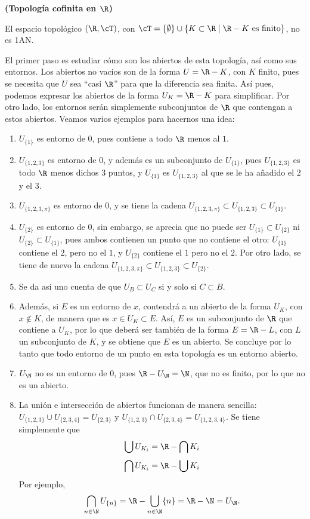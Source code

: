\begin{ej}
    {\bf (Topología cofinita en $\R$)} 
    \item El espacio topológico $(\R, \cT)$, con $\cT = \{\emptyset\} \cup \{K \subset \R \mid \R - K \text{ es finito}\}$, no es 1AN.\smallskip
    
    El primer paso es estudiar cómo son los abiertos de esta topología, así como sus entornos. Los abiertos no vacíos son de la forma $U = \R - K$, con $K$ finito, pues se necesita que $U$ sea ``casi $\R$'' para que la diferencia sea finita.  Así pues, podemos expresar los abiertos de la forma $U_K = \R - K$ para simplificar. Por otro lado, los entornos serán simplemente subconjuntos de $\R$ que contengan a estos abiertos. Veamos varios ejemplos para hacernos una idea:
    \begin{enumerate}[label=--, topsep=0pt, itemsep=0pt]
        \item $U_{\{1\}}$ es entorno de $0$, pues contiene a todo $\R$ menos al $1$.
        \item $U_{\{1,2,3\}}$ es entorno de $0$, y además es un subconjunto de $U_{\{1\}}$, pues $U_{\{1,2,3\}}$ es todo $\R$ menos dichos $3$ puntos, y $U_{\{1\}}$ es $U_{\{1,2,3\}}$ al que se le ha añadido el $2$ y el $3$.
        \item $U_{\{1,2,3, \pi\}}$ es entorno de $0$, y se tiene la cadena $U_{\{1,2,3,\pi\}} \subset U_{\{1,2,3\}} \subset U_{\{1\}}$. 
        \item $U_{\{2\}}$ es entorno de $0$, sin embargo, se aprecia que no puede ser $U_{\{1\}}\subset U_{\{2\}}$ ni $U_{\{2\}}\subset U_{\{1\}}$, pues ambos contienen un punto que no contiene el otro: $U_{\{1\}}$ contiene el $2$, pero no el $1$, y $U_{\{2\}}$ contiene el $1$ pero no el $2$. Por otro lado, se tiene de nuevo la cadena $U_{\{1,2,3,\pi\}} \subset U_{\{1,2,3\}} \subset U_{\{2\}}$.
        \item Se da así uno cuenta de que $U_B \subset U_C$ si y solo si $C\subset B$.
        \item Además, si $E$ es un entorno de $x$, contendrá a un abierto de la forma $U_K$, con $x\not\in K$, de manera que es $x\in U_K \subset E$. Así, $E$ es un subconjunto de $\R$ que contiene a $U_K$, por lo que deberá ser también de la forma $E = \R - L$, con $L$ un subconjunto de $K$, y se obtiene que $E$ es un abierto. Se concluye por lo tanto que todo entorno de un punto en esta topología es un entorno abierto.
        \item $U_\N$ no es un entorno de $0$, pues $\R - U_\N = \N$, que no es finito, por lo que no es un abierto.
        \item La unión e intersección de abiertos funcionan de manera sencilla: $U_{\{1,2,3\}} \cup U_{\{2,3,4\}} = U_{\{2,3\}}$ y $U_{\{1,2,3\}} \cap U_{\{2,3,4\}} = U_{\{1,2,3,4\}}$. Se tiene simplemente que 
        \[
            \bigcup U_{K_i} = \R - \bigcap K_i
        \]
        \[
            \bigcap U_{K_i} = \R - \bigcup K_i
        \]
        Por ejemplo, 
        \[
            \bigcap\limits_{n\in\N} U_{\{n\}} = \R - \bigcup\limits_{n\in\N} \{n\} = \R - \N = U_\N.
        \]


\end{enumerate}
\end{ej}
